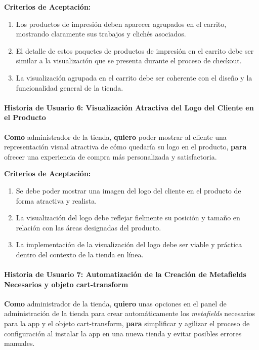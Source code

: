 \documentclass[11pt]{article}
\newcommand{\subsubsubsection}[1]{\paragraph{#1}}
\begin{document}
\vspace{0.5cm}
\textbf{Criterios de Aceptación:}
\begin{enumerate}[label=\arabic*.]
    \item Los productos de impresión deben aparecer agrupados en el carrito, mostrando claramente sus trabajos y clichés asociados.
    \item El detalle de estos paquetes de productos de impresión en el carrito debe ser similar a la visualización que se presenta durante el proceso de checkout.
    \item La visualización agrupada en el carrito debe ser coherente con el diseño y la funcionalidad general de la tienda.
\end{enumerate}


\subsubsubsection{Historia de Usuario 6: Visualización Atractiva del Logo del Cliente en el Producto}\label{sec:historia6}

\textbf{Como} administrador de la tienda,
\textbf{quiero} poder mostrar al cliente una representación visual atractiva de cómo quedaría su logo en el producto,
\textbf{para} ofrecer una experiencia de compra más personalizada y satisfactoria.

\vspace{0.5cm}
\textbf{Criterios de Aceptación:}
\begin{enumerate}[label=\arabic*.]
    \item Se debe poder mostrar una imagen del logo del cliente en el producto de forma atractiva y realista.
    \item La visualización del logo debe reflejar fielmente su posición y tamaño en relación con las áreas designadas del producto.
    \item La implementación de la visualización del logo debe ser viable y práctica dentro del contexto de la tienda en línea.
\end{enumerate}


\subsubsubsection{Historia de Usuario 7: Automatización de la Creación de Metafields Necesarios y objeto cart-transform}\label{sec:historia7}

\textbf{Como} administrador de la tienda,
\textbf{quiero} unas opciones en el panel de administración de la tienda para crear automáticamente los \textit{metafields} necesarios para la app y el objeto cart-transform,
\textbf{para} simplificar y agilizar el proceso de configuración al instalar la app en una nueva tienda y evitar posibles errores manuales.
\end{document}
